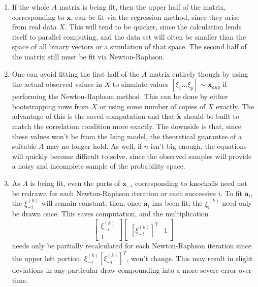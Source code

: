 \documentclass[11pt]{article}
\theoremstyle{definition}
\begin{document}
        \begin{enumerate}
            \item If the whole $A$ matrix is being fit, then the upper half of the matrix, corresponding to $\mathbf x$, can be fit via the regression method, since they arise from real data $X$. This will tend to be quicker, since the calculation lends itself to parallel computing, and the data set will often be smaller than the space of all binary vectors or a simulation of that space. The second half of the matrix still must be fit via Newton-Raphson.
            \item One can avoid fitting the first half of the $A$ matrix entirely though by using the actual observed values in $X$ to simulate values $[\xi_1\ldots \xi_p]\sim \mathbf x_{aug}$ if performing the Newton-Raphson method. This can be done by either bootstrapping rows from $X$ or using some number of copies of $X$ exactly. The advantage of this is the saved computation and that $\mathbf{\tilde x}$ should be built to match the correlation condition more exactly. The downside is that, since these values won't be from the Ising model, the theoretical guarantee of a suitable $A$ may no longer hold. As well, if $n$ isn't big enough, the equations will quickly become difficult to solve, since the observed samples will provide a noisy and incomplete sample of the probability space.
            \item As $A$ is being fit, even the parts of $\mathbf x_{-i}$ corresponding to knockoffs need not be redrawn for each Newton-Raphson iteration or each successive $i$. To fit $\mathbf a_i$, the $\xi_{-i}^{(k)}$ will remain constant; then, once $\mathbf a_i$ has been fit, the $\xi_i^{(k)}$ need only be drawn once. This saves computation, and the multiplication
            \[ \left[\begin{array}{c} \xi_{-i}^{(k)} \\ 1 \end{array}\right]\left[\begin{array}{cc} [\xi_{-i}^{(k)}]^T & 1 \end{array}\right] \]
                needs only be partially recalculated for each Newton-Raphson iteration since the upper left portion, $\xi_{-i}^{(k)}[\xi_{-i}^{(k)}]^T$, won't change. This may result in slight deviations in any particular draw compounding into a more severe error over time.

\end{enumerate}
\end{document}

